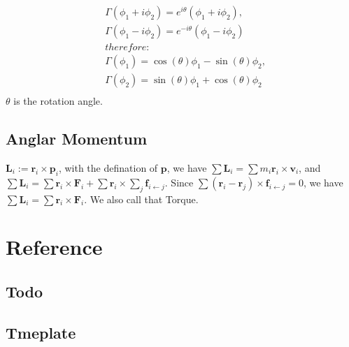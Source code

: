 \begin{equation}
    \begin{split}
    &\Gamma (\phi_1 + i \phi_2)   = e^{i\theta}(\phi_1 + i \phi_2) ,\\
    & \Gamma (\phi_1 - i \phi_2)   = e^{-i\theta}(\phi_1 - i \phi_2) \\
    &therefore:\\
    & \Gamma (\phi_1 ) = \cos(\theta) \phi_1  - \sin(\theta) \phi_2, \\
    &  \Gamma (\phi_2) = \sin(\theta) \phi_1  +\cos(\theta) \phi_2\\
\end{split}
\end{equation}
$\theta$ is the rotation angle.







\subsection{Anglar Momentum}
$\boldsymbol{L}_i := \boldsymbol{r}_i \times \boldsymbol{p}_i  $, with the defination of $\boldsymbol{p}$, we have $\sum \boldsymbol{L}_i  =\sum m_i \boldsymbol{r}_i \times \boldsymbol{v}_i$, and $\sum \boldsymbol{L}_i  =\sum \boldsymbol{r}_i \times \boldsymbol{F}_i + \sum \boldsymbol{r}_i \times \sum_j \boldsymbol{f}_{i \leftarrow j}$. Since $\sum(\boldsymbol{r}_i -\boldsymbol{r}_j) \times \boldsymbol{f}_{i \leftarrow j}  = 0$, we have $\sum \boldsymbol{L}_i  =\sum \boldsymbol{r}_i \times \boldsymbol{F}_i $. We also call that Torque.














\section{Reference}

\subsection{Todo}





\subsection{Tmeplate}

